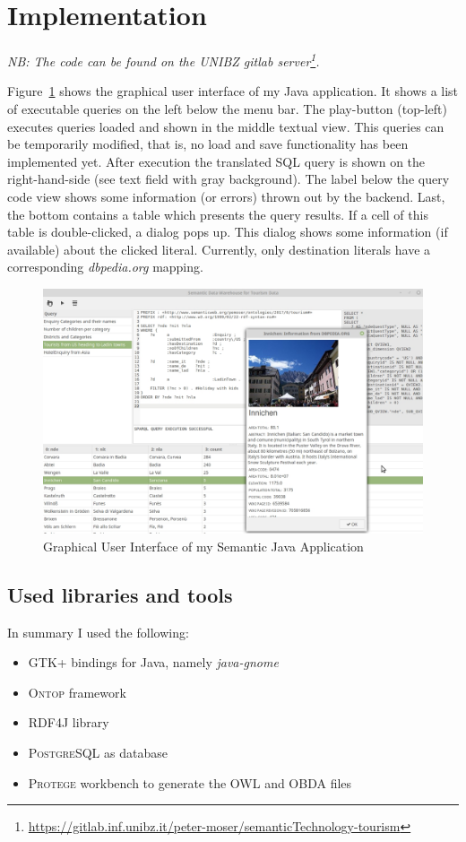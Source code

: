 
\section{Implementation}
\label{chapter:implementation}

\textit{NB: The code can be found on the UNIBZ gitlab server\footnote{ \url{https://gitlab.inf.unibz.it/peter-moser/semanticTechnology-tourism}}.}

Figure~\ref{fig:GUI} shows the graphical user interface of my Java application. It shows a list of executable queries on the left below the menu bar. The play-button (top-left) executes queries loaded and shown in the middle textual view. This queries can be temporarily modified, that is, no load and save functionality has been implemented yet. After execution the translated SQL query is shown on the right-hand-side (see text field with gray background). The label below the query code view shows some information (or errors) thrown out by the backend. Last, the bottom contains a table which presents the query results. If a cell of this table is double-clicked, a dialog pops up. This dialog shows some information (if available) about the clicked literal. Currently, only destination literals have a corresponding \textit{dbpedia.org} mapping.

\begin{figure}
\centering
\includegraphics[width=0.7\linewidth]{img/GUI}
\caption{Graphical User Interface of my Semantic Java Application}
\label{fig:GUI}
\end{figure}

\subsection{Used libraries and tools}

In summary I used the following:
\begin{itemize}
\item GTK+ bindings for Java, namely \textit{java-gnome}
\item \textsc{Ontop} framework
\item \textsc{RDF4J} library
\item \textsc{PostgreSQL} as database
\item \textsc{Protege} workbench to generate the OWL and OBDA files
\end{itemize}

